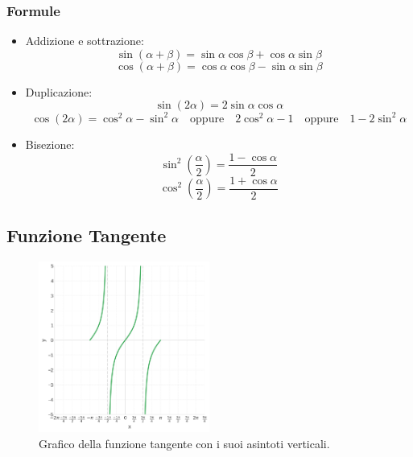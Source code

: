 \subsubsection{Formule}
\begin{itemize}
    \item Addizione e sottrazione:
    \[
      \sin(\alpha+\beta) = \sin\alpha \cos\beta + \cos\alpha \sin\beta
    \]
    \[
      \cos(\alpha+\beta) = \cos\alpha \cos\beta - \sin\alpha \sin\beta
    \]
\end{itemize}
\begin{itemize}
    \item Duplicazione:
    \[
      \sin(2\alpha) = 2 \sin\alpha \cos\alpha
    \]
    \[
      \cos(2\alpha) = \cos^2\alpha - \sin^2\alpha \quad \text{oppure} \quad 2\cos^2\alpha - 1 \quad \text{oppure} \quad 1 - 2\sin^2\alpha
    \]
\end{itemize}
\begin{itemize}
    \item Bisezione:
    \[
      \sin^2\left(\frac{\alpha}{2}\right) = \frac{1 - \cos\alpha}{2}
    \]
    \[
      \cos^2\left(\frac{\alpha}{2}\right) = \frac{1 + \cos\alpha}{2}
    \]
\end{itemize}

\subsection{Funzione Tangente}

\begin{figure}[H]
    \centering
    \includegraphics[width=0.5\textwidth]{./img/tangente.png}
    \caption{Grafico della funzione tangente con i suoi asintoti verticali.}
    \label{fig:tangente}
\end{figure}
\FloatBarrier

